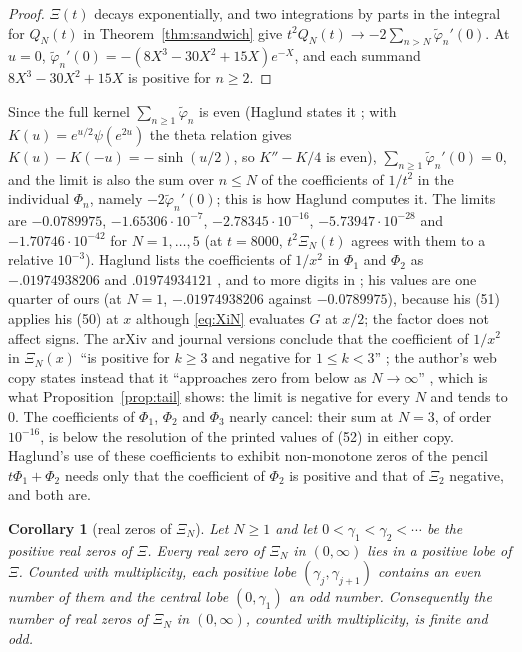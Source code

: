 \documentclass[11pt]{article}
\theoremstyle{plain}
\newtheorem{corollary}[theorem]{Corollary}
\theoremstyle{definition}
\theoremstyle{remark}
\newcommand{\tphi}{\widetilde{\varphi}}
\begin{document}
\begin{proof}
$\Xi(t)$ decays exponentially, and two integrations by parts in the integral
for $Q_N(t)$ in Theorem~\ref{thm:sandwich} give
$t^2 Q_N(t) \to -2\sum_{n > N}\tphi_n'(0)$. At $u = 0$,
$\tphi_n'(0) = -(8X^3 - 30X^2 + 15X)e^{-X}$, and each summand
$8X^3 - 30X^2 + 15X$ is positive for $n \ge 2$.
\end{proof}

Since the full kernel $\sum_{n \ge 1}\tphi_n$ is even (Haglund states it
\cite[p.~2]{Hag}; with $K(u) = e^{u/2}\psi(e^{2u})$ the theta relation gives
$K(u) - K(-u) = -\sinh(u/2)$, so $K'' - K/4$ is even),
$\sum_{n\ge1}\tphi_n'(0) = 0$, and the limit is also the sum over $n \le N$ of
the coefficients of $1/t^2$ in the individual $\Phi_n$, namely
$-2\tphi_n'(0)$; this is how Haglund computes it. The limits are $-0.0789975$,
$-1.65306\cdot10^{-7}$, $-2.78345\cdot10^{-16}$, $-5.73947\cdot10^{-28}$ and
$-1.70746\cdot10^{-42}$ for $N = 1, \ldots, 5$ (at $t = 8000$, $t^2\Xi_N(t)$ agrees with
them to a relative $10^{-3}$). Haglund lists the coefficients of
$1/x^2$ in $\Phi_1$ and $\Phi_2$ as $-.01974938206$ and $.01974934121$
\cite[(52), p.~10]{Hag}, and to more digits in \cite[(52)]{HagW}; his values
are one quarter of ours (at $N = 1$, $-.01974938206$ against $-0.0789975$),
because his (51) applies his (50) at $x$ although \eqref{eq:XiN} evaluates $G$
at $x/2$; the factor does not affect signs. The arXiv and journal versions
conclude that the coefficient of $1/x^2$ in $\Xi_N(x)$ ``is positive for
$k \ge 3$ and negative for $1 \le k < 3$'' \cite[p.~10]{Hag}; the author's web copy
states instead that it ``approaches zero from below as $N \to \infty$''
\cite[p.~10]{HagW}, which is what Proposition~\ref{prop:tail} shows: the limit
is negative for every $N$ and tends to $0$. The coefficients of $\Phi_1$, $\Phi_2$ and $\Phi_3$ nearly cancel: their sum at $N = 3$, of
order $10^{-16}$, is below the resolution of the printed values of (52) in
either copy. Haglund's use of these coefficients to exhibit non-monotone zeros of
the pencil $t\Phi_1 + \Phi_2$ needs only that the coefficient of $\Phi_2$ is
positive and that of $\Xi_2$ negative, and both are.

\begin{corollary}[real zeros of $\Xi_N$]\label{cor:odd}
Let $N \ge 1$ and let $0 < \gamma_1 < \gamma_2 < \cdots$ be the positive real zeros of
$\Xi$. Every real zero of $\Xi_N$ in $(0, \infty)$ lies in a positive lobe of
$\Xi$. Counted with multiplicity, each positive lobe $(\gamma_j, \gamma_{j+1})$
contains an even number of them and the central lobe $(0, \gamma_1)$ an odd
number. Consequently the number of real zeros of $\Xi_N$ in $(0, \infty)$,
counted with multiplicity, is finite and odd.
\end{corollary}
\end{document}
